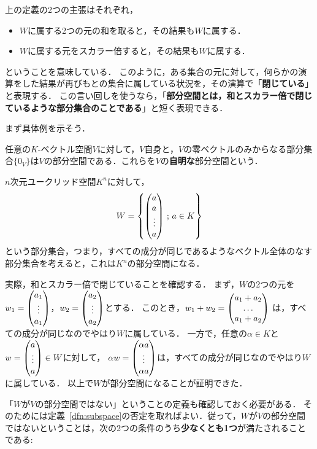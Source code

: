 上の定義の2つの主張はそれぞれ，
\begin{itemize}
    \item $W$に属する2つの元の和を取ると，その結果も$W$に属する．
    \item $W$に属する元をスカラー倍すると，その結果も$W$に属する．
\end{itemize}
ということを意味している．
このように，ある集合の元に対して，何らかの演算をした結果が再びもとの集合に属している状況を，その演算で「\textbf{閉じている}」と表現する．
この言い回しを使うなら，「\textbf{部分空間とは，和とスカラー倍で閉じているような部分集合のことである}」と短く表現できる．

まず具体例を示そう．
\begin{example}
    任意の$K$-ベクトル空間$V$に対して，$V$自身と，$V$の零ベクトルのみからなる部分集合$\{0_V\}$は$V$の部分空間である．これらを$V$の\textbf{自明な}部分空間という．
\end{example}
\begin{example}
    $n$次元ユークリッド空間$K^n$に対して，
    \[
        W = \left\{ \begin{pmatrix} a \\ a \\ \vdots \\ a \end{pmatrix} \,;\, a \in K\right\}
    \]
    という部分集合，つまり，すべての成分が同じであるようなベクトル全体のなす部分集合を考えると，これは$K^n$の部分空間になる．
    
    実際，和とスカラー倍で閉じていることを確認する．
    まず，$W$の2つの元を$w_1 = \begin{pmatrix} a_1 \\ \vdots \\a_1 \end{pmatrix}$，$w_2 = \begin{pmatrix} a_2 \\ \vdots \\a_2 \end{pmatrix}$とする．
    このとき，$w_1 + w_2 = \begin{pmatrix} a_1 + a_2 \\  \dots \\ a_1 + a_2 \end{pmatrix}$
    は，すべての成分が同じなのでやはり$W$に属している．
    一方で，任意の$\alpha \in K$と$w = \begin{pmatrix} a \\  \vdots \\ a \end{pmatrix} \in W$に対して，
    $\alpha w = \begin{pmatrix} \alpha a \\  \vdots \\ \alpha a \end{pmatrix}$は，すべての成分が同じなのでやはり$W$に属している．
    以上で$W$が部分空間になることが証明できた．
\end{example}
「$W$が$V$の部分空間ではない」ということの定義も確認しておく必要がある．
そのためには定義~\ref{dfn:subspace}の否定を取ればよい．従って，$W$が$V$の部分空間ではないということは，次の2つの条件のうち\textbf{少なくとも1つ}が満たされることである:%
